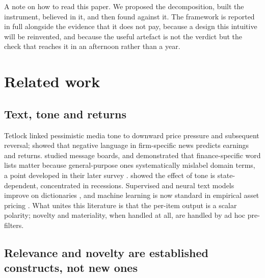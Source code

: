 A note on how to read this paper. We proposed the decomposition, built the
instrument, believed in it, and then found against it. The framework is reported
in full alongside the evidence that it does not pay, because a design this
intuitive will be reinvented, and because the useful artefact is not the verdict
but the check that reaches it in an afternoon rather than a year.

\section{Related work}\label{sec:related}

\subsection{Text, tone and returns}

Tetlock \citep{tetlock2007} linked pessimistic media tone to downward price
pressure and subsequent reversal; \citet{tetlock2008} showed that negative
language in firm-specific news predicts earnings and returns.
\citet{antweiler2004} studied message boards, and \citet{loughran2011}
demonstrated that finance-specific word lists matter because general-purpose ones
systematically mislabel domain terms, a point developed in their later survey
\citep{loughran2016}. \citet{garcia2013} showed the effect of tone is
state-dependent, concentrated in recessions. Supervised and neural text models
improve on dictionaries \citep{ke2019,huang2023}, and machine learning is now
standard in empirical asset pricing \citep{gu2020}. What unites this literature
is that the per-item output is a scalar polarity; novelty and materiality, when
handled at all, are handled by ad hoc pre-filters.

\subsection{Relevance and novelty are established constructs, not new ones}

